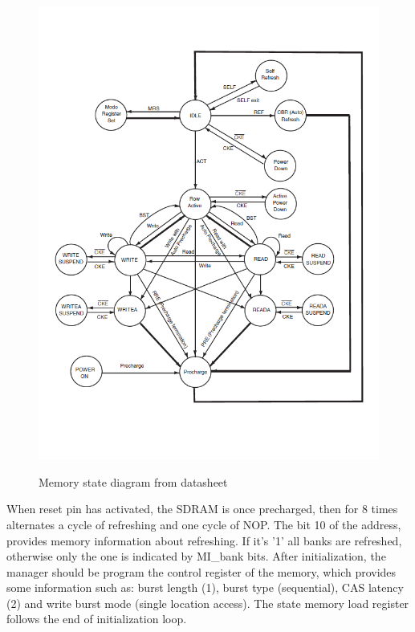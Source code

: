 \begin{figure}[H]
\centering
\includegraphics[scale=1.1]{Immagini/34}
\label{26}
\caption{Memory state diagram from datasheet}
\end{figure}

When reset pin has activated, the SDRAM is once precharged, then for 8 times alternates a cycle of refreshing and one cycle of NOP. The bit 10 of the address, provides memory information about refreshing. If it's '1' all banks are refreshed, otherwise only the one is indicated by MI\_bank bits. After initialization, the manager should be program the control register of the memory, which provides some information such as: burst length (1), burst type (sequential), CAS latency (2) and write burst mode (single location access). The state memory load register follows the end of initialization loop.

